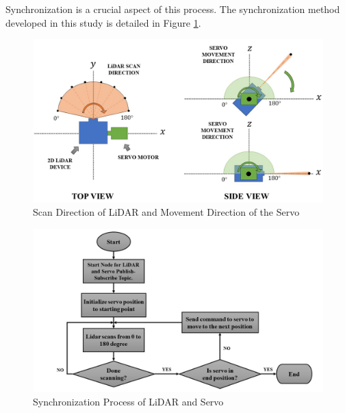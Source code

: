 Synchronization is a crucial aspect of this process. The synchronization method developed in this study is detailed in Figure \ref{ch3:fig:servo_lidar_comm}.


\begin{figure}[H]
	\centering
	\includegraphics[width=1\textwidth]{Figures/scan_direction_of_lidar_and_servo}
	\caption{Scan Direction of LiDAR and Movement Direction of the Servo}
	\label{ch3:fig:servo_lidar_comm}
\end{figure}

\begin{figure}[H]
	\centering
	\includegraphics[width=1\textwidth]{Figures/servo_lidar_comm}
	\caption{Synchronization Process of LiDAR and Servo}
	\label{ch3:fig:scan_and_movement_direction}
\end{figure}


